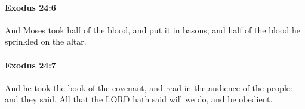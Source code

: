 		\paragraph{Exodus 24:6} %
			\label{EXODUS-24-6}

			And Moses took half of the blood, and put it in basons; and half of the blood he sprinkled on the altar.


		\paragraph{Exodus 24:7} %
			\label{EXODUS-24-7}

			And he took the book of the covenant, and read in the audience of the people: and they said, All that the LORD hath said will we do, and be obedient.


